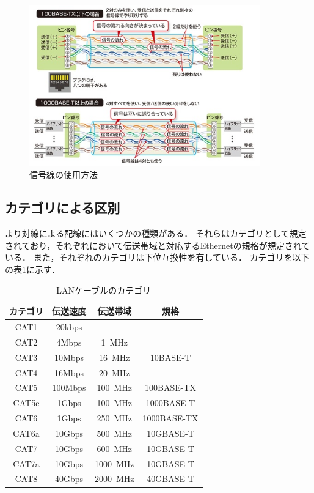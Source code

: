 \documentclass[a4paper]{ltjsarticle}
\begin{document}
\begin{figure}[H]
  \centering
  \includegraphics[width=10cm]{twistpair_system.jpg}
  \caption{信号線の使用方法\cite{2}}
\end{figure}

\subsection{カテゴリによる区別}\label{ux30abux30c6ux30b4ux30eaux306bux3088ux308bux533aux5225}

より対線による配線にはいくつかの種類がある．
それらはカテゴリとして規定されており，それぞれにおいて伝送帯域と対応するEthernetの規格が規定されている．
また，それぞれのカテゴリは下位互換性を有している． 
カテゴリを以下の表1に示す．

\begin{table}[H]
  \centering
  \caption{LANケーブルのカテゴリ}
  \begin{tabular}{c|c|c|c}
    カテゴリ & 伝送速度 & 伝送帯域 & 規格 \\ \hline
    CAT1 & 20kbps & - & \\
    CAT2 & 4Mbps & \SI{1}{MHz} & \\
    CAT3 & 10Mbps & \SI{16}{MHz} & 10BASE-T\\
    CAT4 & 16Mbps & \SI{20}{MHz} & \\
    CAT5 & 100Mbps & \SI{100}{MHz} & 100BASE-TX\\
    CAT5e & 1Gbps & \SI{100}{MHz} & 1000BASE-T\\
    CAT6 & 1Gbps & \SI{250}{MHz} & 1000BASE-TX\\
    CAT6a & 10Gbps & \SI{500}{MHz} & 10GBASE-T\\
    CAT7 & 10Gbps & \SI{600}{MHz} & 10GBASE-T\\
    CAT7a & 10Gbps & \SI{1000}{MHz} & 10GBASE-T\\
    CAT8 & 40Gbps & \SI{2000}{MHz} & 40GBASE-T\\
  \end{tabular}
\end{table}
\end{document}
